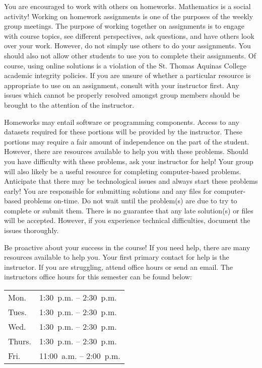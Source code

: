 \documentclass[11pt,letterpaper]{article}
\begin{document}
You are encouraged to work with others on homeworks. Mathematics is a social activity! Working on homework assignments is one of the purposes of the weekly group meetings. The purpose of working together on assignments is to engage with course topics, see different perspectives, ask questions, and have others look over your work. However, do not simply use others to do your assignments. You should also not allow other students to use you to complete their assignments. Of course, using online solutions is a violation of the St. Thomas Aquinas College academic integrity policies. If you are unsure of whether a particular resource is appropriate to use on an assignment, consult with your instructor first. Any issues which cannot be properly resolved amongst group members should be brought to the attention of the instructor. \pspace

Homeworks may entail software or programming components. Access to any datasets required for these portions will be provided by the instructor. These portions may require a fair amount of independence on the part of the student. However, there are resources available to help you with these problems. Should you have difficulty with these problems, ask your instructor for help! Your group will also likely be a useful resource for completing computer-based problems. Anticipate that there may be technological issues and always start these problems early! You are responsible for submitting solutions and any files for computer-based problems on-time. Do not wait until the problem(s) are due to try to complete or submit them. There is no guarantee that any late solution(s) or files will be accepted. However, if you experience technical difficulties, document the issues thoroughly. 
\sectionbreak



Be proactive about your success in the course! If you need help, there are many resources available to help you. Your first primary contact for help is the instructor. If you are struggling, attend office hours or send an email. The instructors office hours for this semester can be found below: \par

	\begin{table}[!ht]
	\centering
	\begin{tabular}{l || l}
	Mon. & 1:30~p.m. -- 2:30~p.m. \\
	Tues. & 1:30~p.m. -- 2:30~p.m. \\
	Wed. & 1:30~p.m. -- 2:30~p.m. \\
	Thurs. & 1:30~p.m. -- 2:30~p.m. \\
	Fri. & 11:00~a.m. -- 2:00~p.m.
	\end{tabular}
	\end{table} \par
\end{document}
